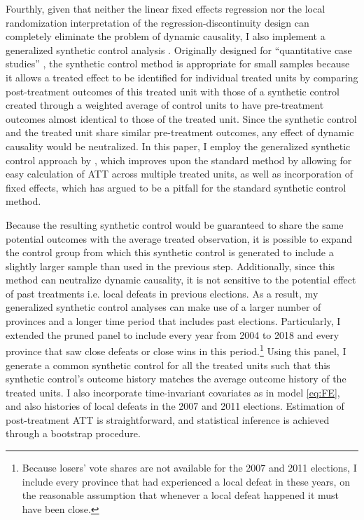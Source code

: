 \documentclass[12pt]{article}
\newcommand{\1}{\mathbbm{1}}
\begin{document}
Fourthly, given that neither the linear fixed effects regression nor the local randomization interpretation of the regression-discontinuity design can completely eliminate the problem of dynamic causality, I also implement a generalized synthetic control analysis \citep{Xu2017gsynth}. Originally designed for ``quantitative case studies'' \cite{Abadie2010, Abadie2015}, the synthetic control method is appropriate for small samples because it allows a treated effect to be identified for individual treated units by comparing post-treatment outcomes of this treated unit with those of a synthetic control created through a weighted average of control units to have pre-treatment outcomes almost identical to those of the treated unit. Since the synthetic control and the treated unit share similar pre-treatment outcomes, any effect of dynamic causality would be neutralized. In this paper, I employ the generalized synthetic control approach by \citet{Xu2017gsynth}, which improves upon the standard method by allowing for easy calculation of ATT across multiple treated units, as well as incorporation of fixed effects, which \citet{ImaiKim2012} has argued to be a pitfall for the standard synthetic control method. 

Because the resulting synthetic control would be guaranteed to share the same potential outcomes with the average treated observation, it is possible to expand the control group from which this synthetic control is generated to include a slightly larger sample than used in the previous step. Additionally, since this method can neutralize dynamic causality, it is not sensitive to the potential effect of past treatments i.e. local defeats in previous elections. As a result, my generalized synthetic control analyses can make use of a larger number of provinces and a longer time period that includes past elections. Particularly, I extended the pruned panel to include every year from 2004 to 2018 and every province that saw close defeats or close wins in this period.\footnote{Because losers' vote shares are not available for the 2007 and 2011 elections, I include every province that had experienced a local defeat in these years, on the reasonable assumption that whenever a local defeat happened it must have been close.} Using this panel, I generate a common synthetic control for all the treated units such that this synthetic control's outcome history matches the average outcome history of the treated units. I also incorporate time-invariant covariates as in model \eqref{eq:FE}, and also histories of local defeats in the 2007 and 2011 elections. Estimation of post-treatment ATT is straightforward, and statistical inference is achieved through a bootstrap procedure.
\end{document}
